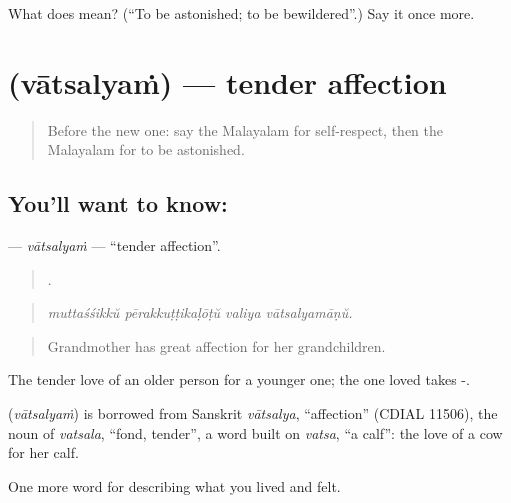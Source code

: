 \begin{tcolorbox}[breakable,colback=teal!4,colframe=teal!35!black,title={Before you move on}]
What does  mean? (\textquotedblleft{}To be astonished; to be bewildered\textquotedblright{}.) Say it once more.
\end{tcolorbox}
\section[\texorpdfstring{\ml{വാത്സല്യം} (vātsalyaṁ)}{വാത്സല്യം (vātsalyaṁ)}]{ (vātsalyaṁ) — tender affection}

\label{lesson:ML-C519-vatsalyam}



\begin{quote}
Before the new one: say the Malayalam for self-respect, then the Malayalam for to be astonished.
\end{quote}

\subsection*{You'll want to know: }
\textbf{} — \emph{vātsalyaṁ} — \textquotedblleft{}tender affection\textquotedblright{}.

\begin{quote}
   .
\end{quote}

\begin{quote}
\emph{muttaśśikkŭ pērakkuṭṭikaḷōṭŭ valiya vātsalyamāṇŭ.}
\end{quote}

\begin{quote}
Grandmother has great affection for her grandchildren.
\end{quote}

The tender love of an older person for a younger one; the one loved takes -.

\begin{cousinweb}
\textbf{} (\emph{vātsalyaṁ}) is borrowed from Sanskrit \emph{vātsalya}, \textquotedblleft{}affection\textquotedblright{} (CDIAL 11506), the noun of \emph{vatsala}, \textquotedblleft{}fond, tender\textquotedblright{}, a word built on \emph{vatsa}, \textquotedblleft{}a calf\textquotedblright{}: the love of a cow for her calf.
\end{cousinweb}

\begin{grammarlens}[title={What you've built}]
One more word for describing what you lived and felt.
\end{grammarlens}

